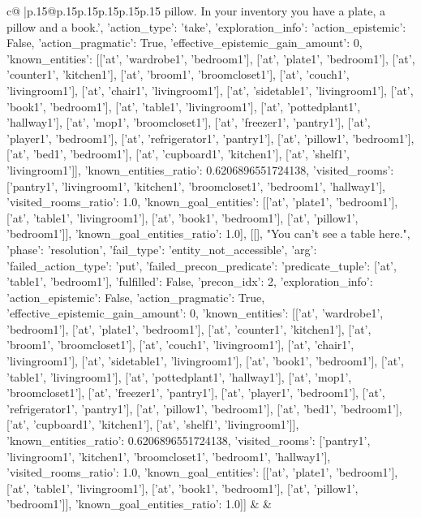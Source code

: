 \documentclass{article}
\begin{document}
{\begin{supertabular}{c@{$\;$}|p{.15\linewidth}@{}p{.15\linewidth}p{.15\linewidth}p{.15\linewidth}p{.15\linewidth}p{.15\linewidth}}
{{{pillow. In your inventory you have a plate, a pillow and a book.', {'action_type': 'take', 'exploration_info': {'action_epistemic': False, 'action_pragmatic': True, 'effective_epistemic_gain_amount': 0, 'known_entities': [['at', 'wardrobe1', 'bedroom1'], ['at', 'plate1', 'bedroom1'], ['at', 'counter1', 'kitchen1'], ['at', 'broom1', 'broomcloset1'], ['at', 'couch1', 'livingroom1'], ['at', 'chair1', 'livingroom1'], ['at', 'sidetable1', 'livingroom1'], ['at', 'book1', 'bedroom1'], ['at', 'table1', 'livingroom1'], ['at', 'pottedplant1', 'hallway1'], ['at', 'mop1', 'broomcloset1'], ['at', 'freezer1', 'pantry1'], ['at', 'player1', 'bedroom1'], ['at', 'refrigerator1', 'pantry1'], ['at', 'pillow1', 'bedroom1'], ['at', 'bed1', 'bedroom1'], ['at', 'cupboard1', 'kitchen1'], ['at', 'shelf1', 'livingroom1']], 'known_entities_ratio': 0.6206896551724138, 'visited_rooms': ['pantry1', 'livingroom1', 'kitchen1', 'broomcloset1', 'bedroom1', 'hallway1'], 'visited_rooms_ratio': 1.0, 'known_goal_entities': [['at', 'plate1', 'bedroom1'], ['at', 'table1', 'livingroom1'], ['at', 'book1', 'bedroom1'], ['at', 'pillow1', 'bedroom1']], 'known_goal_entities_ratio': 1.0}}], [[], "You can't see a table here.", {'phase': 'resolution', 'fail_type': 'entity_not_accessible', 'arg': {'failed_action_type': 'put', 'failed_precon_predicate': {'predicate_tuple': ['at', 'table1', 'bedroom1'], 'fulfilled': False, 'precon_idx': 2}}, 'exploration_info': {'action_epistemic': False, 'action_pragmatic': True, 'effective_epistemic_gain_amount': 0, 'known_entities': [['at', 'wardrobe1', 'bedroom1'], ['at', 'plate1', 'bedroom1'], ['at', 'counter1', 'kitchen1'], ['at', 'broom1', 'broomcloset1'], ['at', 'couch1', 'livingroom1'], ['at', 'chair1', 'livingroom1'], ['at', 'sidetable1', 'livingroom1'], ['at', 'book1', 'bedroom1'], ['at', 'table1', 'livingroom1'], ['at', 'pottedplant1', 'hallway1'], ['at', 'mop1', 'broomcloset1'], ['at', 'freezer1', 'pantry1'], ['at', 'player1', 'bedroom1'], ['at', 'refrigerator1', 'pantry1'], ['at', 'pillow1', 'bedroom1'], ['at', 'bed1', 'bedroom1'], ['at', 'cupboard1', 'kitchen1'], ['at', 'shelf1', 'livingroom1']], 'known_entities_ratio': 0.6206896551724138, 'visited_rooms': ['pantry1', 'livingroom1', 'kitchen1', 'broomcloset1', 'bedroom1', 'hallway1'], 'visited_rooms_ratio': 1.0, 'known_goal_entities': [['at', 'plate1', 'bedroom1'], ['at', 'table1', 'livingroom1'], ['at', 'book1', 'bedroom1'], ['at', 'pillow1', 'bedroom1']], 'known_goal_entities_ratio': 1.0}}]] 
	  } 
	   } 
	   } 
	 & & \\ 
 

    \theutterance {}  


\end{supertabular}}
\end{document}
